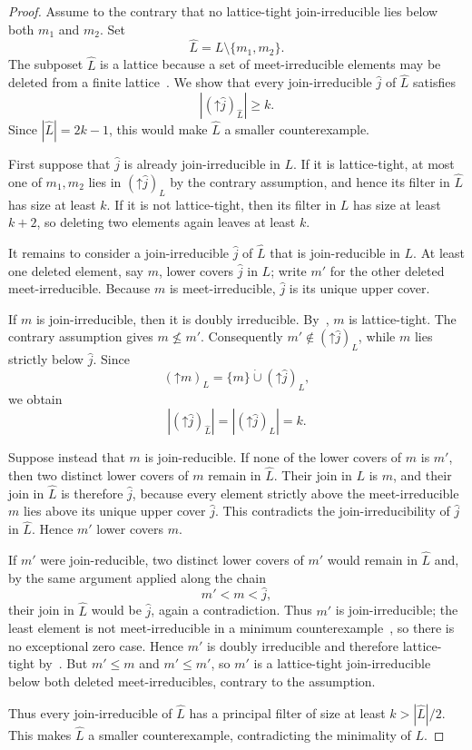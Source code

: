 \documentclass[11pt]{amsart}
\theoremstyle{definition}
\theoremstyle{remark}
\begin{document}
\begin{proof}
Assume to the contrary that no lattice-tight join-irreducible lies below both $m_1$ and $m_2$. Set
\[
  \widehat L=L\setminus\{m_1,m_2\}.
\]
The subposet $\widehat L$ is a lattice because a set of meet-irreducible elements may be deleted from a finite lattice~\cite[Theorem~1.4]{Bouchard2025}. We show that every join-irreducible $\widehat j$ of $\widehat L$ satisfies
\[
  |(\mathord\uparrow\widehat j)_{\widehat L}|\ge k.
\]
Since $|\widehat L|=2k-1$, this would make $\widehat L$ a smaller counterexample.

First suppose that $\widehat j$ is already join-irreducible in $L$. If it is lattice-tight, at most one of $m_1,m_2$ lies in $(\mathord\uparrow\widehat j)_L$ by the contrary assumption, and hence its filter in $\widehat L$ has size at least $k$. If it is not lattice-tight, then its filter in $L$ has size at least $k+2$, so deleting two elements again leaves at least $k$.

It remains to consider a join-irreducible $\widehat j$ of $\widehat L$ that is join-reducible in $L$. At least one deleted element, say $m$, lower covers $\widehat j$ in $L$; write $m'$ for the other deleted meet-irreducible. Because $m$ is meet-irreducible, $\widehat j$ is its unique upper cover.

If $m$ is join-irreducible, then it is doubly irreducible. By~\cite[Lemma~2.5]{Bouchard2025}, $m$ is lattice-tight. The contrary assumption gives $m\nleq m'$. Consequently $m'\notin(\mathord\uparrow\widehat j)_L$, while $m$ lies strictly below $\widehat j$. Since
\[
  (\mathord\uparrow m)_L=\{m\}\mathbin{\dot\cup}(\mathord\uparrow\widehat j)_L,
\]
we obtain
\[
  |(\mathord\uparrow\widehat j)_{\widehat L}|
  =|(\mathord\uparrow\widehat j)_L|=k.
\]

Suppose instead that $m$ is join-reducible. If none of the lower covers of $m$ is $m'$, then two distinct lower covers of $m$ remain in $\widehat L$. Their join in $L$ is $m$, and their join in $\widehat L$ is therefore $\widehat j$, because every element strictly above the meet-irreducible $m$ lies above its unique upper cover $\widehat j$. This contradicts the join-irreducibility of $\widehat j$ in $\widehat L$. Hence $m'$ lower covers $m$.

If $m'$ were join-reducible, two distinct lower covers of $m'$ would remain in $\widehat L$ and, by the same argument applied along the chain
\[
  m'<m<\widehat j,
\]
their join in $\widehat L$ would be $\widehat j$, again a contradiction. Thus $m'$ is join-irreducible; the least element is not meet-irreducible in a minimum counterexample~\cite[Corollary~2.2]{Bouchard2025}, so there is no exceptional zero case. Hence $m'$ is doubly irreducible and therefore lattice-tight by~\cite[Lemma~2.5]{Bouchard2025}. But $m'\le m$ and $m'\le m'$, so $m'$ is a lattice-tight join-irreducible below both deleted meet-irreducibles, contrary to the assumption.

Thus every join-irreducible of $\widehat L$ has a principal filter of size at least $k>|\widehat L|/2$. This makes $\widehat L$ a smaller counterexample, contradicting the minimality of $L$.
\end{proof}
\end{document}

